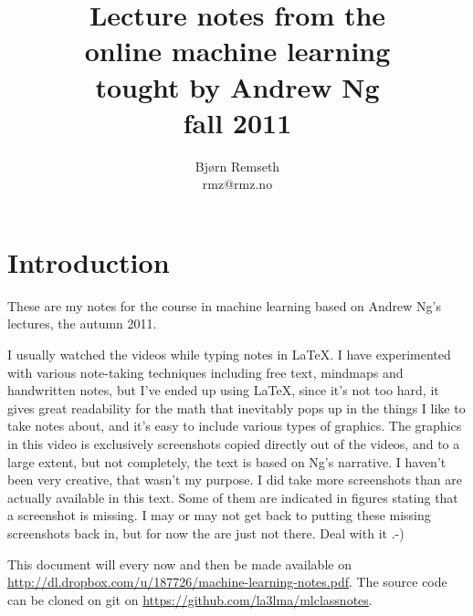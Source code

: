 \documentclass[a4, 12pt, english, USenglish]{scrreprt}
\begin{document}
\title{Lecture notes from the \\
online  machine learning\\
tought by Andrew Ng \\
fall 2011}

\author{Bj\o{}rn Remseth \\ rmz@rmz.no}

\maketitle
\tableofcontents



\begin{abstract}

\end{abstract}

\chapter*{Introduction}

These are my notes for the course in machine learning  based on Andrew
Ng's lectures, the autumn 2011.    

I usually watched the videos while typing notes in \LaTeX.  I have
experimented with various note-taking techniques including free text,
mindmaps and handwritten notes, but I've ended up using \LaTeX, since
it's not too hard, it gives great readability for the math that
inevitably pops up in the things I like to take notes about, and it's
easy to include various types of graphics.  The graphics in this video
is exclusively screenshots copied directly out of the videos, and to a
large extent, but not  completely, the text is based on Ng's
narrative.   I haven't been very creative, that wasn't my purpose.  I
did take more screenshots than are actually available in this text.
Some of them are indicated in figures stating that a screenshot is
missing.  I may or may not get back to putting these missing
screenshots back in, but for  now the are just not there.  Deal with
it .-)

This document will every now and then be made available on
\url{http://dl.dropbox.com/u/187726/machine-learning-notes.pdf}.   The
source code can be cloned on git on \url{https://github.com/la3lma/mlclassnotes}.
\end{document}
